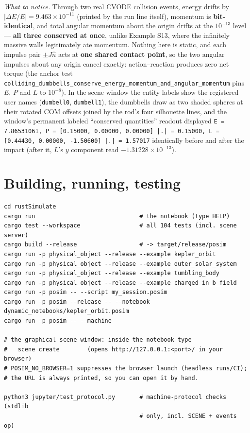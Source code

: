 \documentclass[11pt]{article}
\newcommand{\code}[1]{\texttt{#1}}
\begin{document}
\emph{What to notice.} Through two real CVODE collision events, energy
drifts by $|\Delta E/E| = 9.463\times10^{-11}$ (printed by the run line
itself), momentum is \textbf{bit-identical}, and total angular momentum
about the origin drifts at the $10^{-13}$ level --- \textbf{all three
conserved at once}, unlike Example S13, where the infinitely massive
walls legitimately ate momentum. Nothing here is static, and each
impulse pair $\pm J\hat n$ acts at \textbf{one shared contact point}, so
the two angular impulses about any origin cancel exactly:
action--reaction produces zero net torque (the anchor test
\code{colliding\_dumbbells\_conserve\_energy\_momentum\_and\_angular\_momentum}
pins $E$, $P$ and $L$ to $10^{-8}$). In the scene window the entity
labels show the registered user names (\code{dumbell0},
\code{dumbell1}), the dumbbells draw as two shaded spheres at their
rotated COM offsets joined by the rod's four silhouette lines, and the
window's permanent labeled ``conserved quantities'' readout displayed
\code{E = 7.86531061, P = [0.15000, 0.00000, 0.00000] |.| = 0.15000,
L = [0.44430, 0.00000, -1.50600] |.| = 1.57017} identically before and
after the impact (after it, $L$'s $y$ component read
$-1.31228\times10^{-13}$).

\section{Building, running, testing}

\begin{lstlisting}
cd rustSimulate
cargo run                              # the notebook (type HELP)
cargo test --workspace                 # all 104 tests (incl. scene server)
cargo build --release                  # -> target/release/posim
cargo run -p physical_object --release --example kepler_orbit
cargo run -p physical_object --release --example outer_solar_system
cargo run -p physical_object --release --example tumbling_body
cargo run -p physical_object --release --example charged_in_b_field
cargo run -p posim -- --script my_session.posim
cargo run -p posim --release -- --notebook dynamic_notebooks/kepler_orbit.posim
cargo run -p posim -- --machine

# the graphical scene window: inside the notebook type
#   scene create        (opens http://127.0.0.1:<port>/ in your browser)
# POSIM_NO_BROWSER=1 suppresses the browser launch (headless runs/CI);
# the URL is always printed, so you can open it by hand.

python3 jupyter/test_protocol.py       # machine-protocol checks (stdlib
                                       # only, incl. SCENE + events op)
\end{lstlisting}
\end{document}
